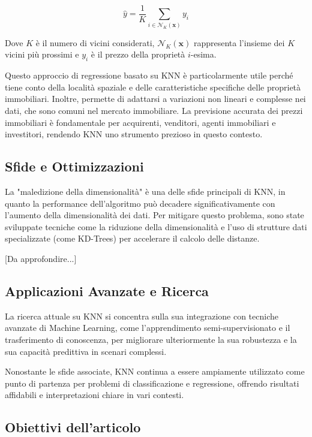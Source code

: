 \[
\hat{y} = \frac{1}{K} \sum_{i \in \mathcal{N}_K(\mathbf{x})} y_i
\]

Dove \( K \) è il numero di vicini considerati, \( \mathcal{N}_K(\mathbf{x}) \) rappresenta l'insieme dei \( K \) vicini più prossimi e \( y_i \) è il prezzo della proprietà $i$-esima.

Questo approccio di regressione basato su KNN è particolarmente utile perché tiene conto della località spaziale e delle caratteristiche specifiche delle proprietà immobiliari. Inoltre, permette di adattarsi a variazioni non lineari e complesse nei dati, che sono comuni nel mercato immobiliare. La previsione accurata dei prezzi immobiliari è fondamentale per acquirenti, venditori, agenti immobiliari e investitori, rendendo KNN uno strumento prezioso in questo contesto.


\subsection{Sfide e Ottimizzazioni}

La "maledizione della dimensionalità" è una delle sfide principali di KNN, in quanto la 
performance dell'algoritmo può decadere significativamente con l'aumento della dimensionalità 
dei dati. Per mitigare questo problema, sono state sviluppate tecniche come la riduzione della 
dimensionalità e l'uso di strutture dati specializzate (come KD-Trees) per accelerare il calcolo 
delle distanze.

[Da approfondire...]

\subsection{Applicazioni Avanzate e Ricerca}

La ricerca attuale su KNN si concentra sulla sua integrazione con tecniche avanzate di 
Machine Learning, come l'apprendimento semi-supervisionato e il trasferimento di conoscenza, 
per migliorare ulteriormente la sua robustezza e la sua capacità predittiva in scenari complessi.

Nonostante le sfide associate, KNN continua a essere ampiamente utilizzato come punto di partenza per problemi di 
classificazione e regressione, offrendo risultati affidabili e interpretazioni chiare in vari contesti.

\subsection{Obiettivi dell'articolo}

